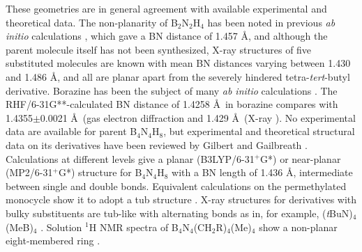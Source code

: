 These geometries are in general agreement with available experimental and theoretical data. The non-planarity of B$_2$N$_2$H$_4$ has been
noted in previous \textit{ab initio} calculations \cite{r26}, which gave a BN distance of 1.457 \AA, and although the parent molecule itself has not
been synthesized, X-ray structures of five substituted molecules \cite{r14} are known with mean BN distances varying between 1.430 and
1.486 \AA, and all are planar apart from the severely hindered tetra-\textit{tert}-butyl derivative. Borazine has been the subject of many
\textit{ab initio} calculations \cite{r27a,r27b,r27c,r27d,r27e,r27f}. The RHF/6-31G**-calculated BN distance of 1.4258 \AA\ in borazine compares with
1.4355$\pm$0.0021 \AA\ (gas electron diffraction \cite{r28a,r28b} and 1.429 \AA\ (X-ray \cite{r28c}). No experimental data are available for
parent B$_4$N$_4$H$_8$, but experimental and theoretical structural data on its derivatives have been reviewed by Gilbert and Gailbreath \cite{r26}.
Calculations at different levels give a planar (B3LYP/6-31$^{+}$G*) or near-planar (MP2/6-31$^{+}$G*) structure for B$_4$N$_4$H$_8$ with a BN length of
1.436 \AA, intermediate between single and double bonds. Equivalent calculations on the permethylated monocycle show it to adopt a tub
structure \cite{r26}. X-ray structures for derivatives with bulky substituents are tub-like with alternating bonds as in, for example,
(\textit{t}BuN)$_4$(MeB)$_4$ \cite{r29}. Solution ${}^1$H NMR spectra of B$_4$N$_4$(CH$_2$R)$_4$(Me)$_4$ show a non-planar eight-membered
ring \cite{r30}.

